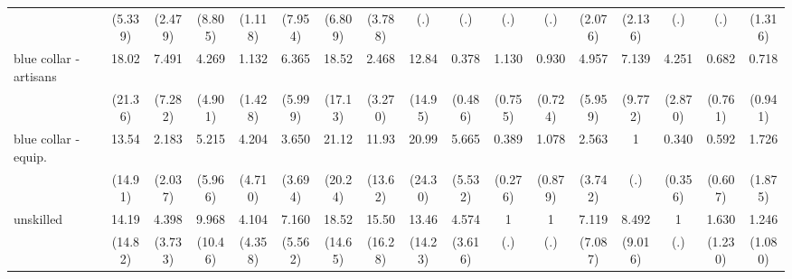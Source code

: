 {\begin{tabular}{l*{16}{c}}
                    &     (5.339)         &     (2.479)         &     (8.805)         &     (1.118)         &     (7.954)         &     (6.809)         &     (3.788)         &         (.)         &         (.)         &         (.)         &         (.)         &     (2.076)         &     (2.136)         &         (.)         &         (.)         &     (1.316)         \\
[1em]
blue collar - artisans&       18.02\sym{*}  &       7.491\sym{*}  &       4.269         &       1.132         &       6.365\sym{*}  &       18.52\sym{**} &       2.468         &       12.84\sym{*}  &       0.378         &       1.130         &       0.930         &       4.957         &       7.139         &       4.251\sym{*}  &       0.682         &       0.718         \\
                    &     (21.36)         &     (7.282)         &     (4.901)         &     (1.428)         &     (5.999)         &     (17.13)         &     (3.270)         &     (14.95)         &     (0.486)         &     (0.755)         &     (0.724)         &     (5.959)         &     (9.772)         &     (2.870)         &     (0.761)         &     (0.941)         \\
[1em]
blue collar - equip.&       13.54\sym{*}  &       2.183         &       5.215         &       4.204         &       3.650         &       21.12\sym{**} &       11.93\sym{*}  &       20.99\sym{**} &       5.665         &       0.389         &       1.078         &       2.563         &           1         &       0.340         &       0.592         &       1.726         \\
                    &     (14.91)         &     (2.037)         &     (5.966)         &     (4.710)         &     (3.694)         &     (20.24)         &     (13.62)         &     (24.30)         &     (5.532)         &     (0.276)         &     (0.879)         &     (3.742)         &         (.)         &     (0.356)         &     (0.607)         &     (1.875)         \\
[1em]
unskilled           &       14.19\sym{*}  &       4.398         &       9.968\sym{*}  &       4.104         &       7.160\sym{*}  &       18.52\sym{***}&       15.50\sym{**} &       13.46\sym{*}  &       4.574         &           1         &           1         &       7.119\sym{*}  &       8.492\sym{*}  &           1         &       1.630         &       1.246         \\
                    &     (14.82)         &     (3.733)         &     (10.46)         &     (4.358)         &     (5.562)         &     (14.65)         &     (16.28)         &     (14.23)         &     (3.616)         &         (.)         &         (.)         &     (7.087)         &     (9.016)         &         (.)         &     (1.230)         &     (1.080)         \\

\end{tabular}}
